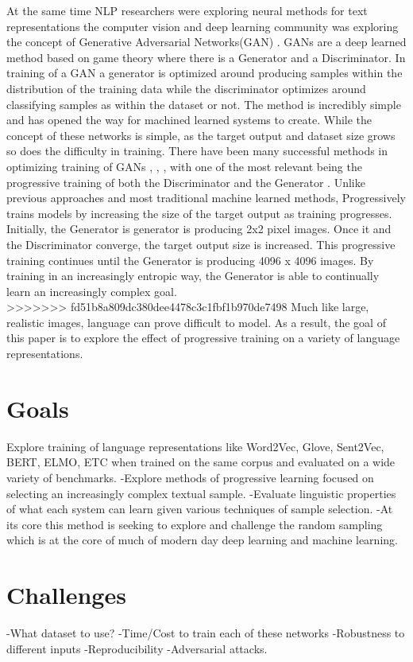 \documentclass [11pt, proquest] {uwthesis}[2020/08/20]
\begin{document}
At the same time NLP researchers were exploring neural methods for text representations the computer vision and deep learning community was exploring the concept of Generative Adversarial Networks(GAN) \cite{}. GANs are a deep learned method based on game theory where there is a Generator and a Discriminator. In training of a GAN a generator is optimized around producing samples within the distribution of the training data while the discriminator optimizes around classifying samples as within the dataset or not. The method is incredibly simple and has opened the way for machined learned systems to create. While the concept of these networks is simple, as the target output and dataset size grows so does the difficulty in training. There have been many successful methods in optimizing training of GANs \cite{}, \cite{}, \cite{}, with one of the most relevant being the progressive training of both the Discriminator and the Generator \cite{}. Unlike previous approaches and most traditional machine learned methods, Progressively trains models by increasing the size of the target output as training progresses. Initially, the Generator is generator is producing 2x2 pixel images. Once it and the Discriminator converge, the target output size is increased. This progressive training continues until the Generator is producing 4096 x 4096 images. By training in an increasingly entropic way, the Generator is able to continually learn an increasingly complex goal. \\
>>>>>>> fd51b8a809dc380dee4478c3c1fbf1b970de7498
Much like large, realistic images, language can prove difficult to model. As a result, the goal of this paper is to explore the effect of progressive training on a variety of language representations.
\section {Goals}
Explore training of language representations like Word2Vec, Glove, Sent2Vec, BERT, ELMO, ETC when trained on the same corpus and evaluated on a wide variety of benchmarks.
-Explore methods of progressive learning focused on selecting an increasingly complex textual sample.
-Evaluate linguistic properties of what each system can learn given various techniques of sample selection.
-At its core this method is seeking to explore and challenge the random sampling which is at the core of much of modern day deep learning and machine learning. 
\section {Challenges}
-What dataset to use?
-Time/Cost to train each of these networks
-Robustness to different inputs
-Reproducibility
-Adversarial attacks.
\end{document}

